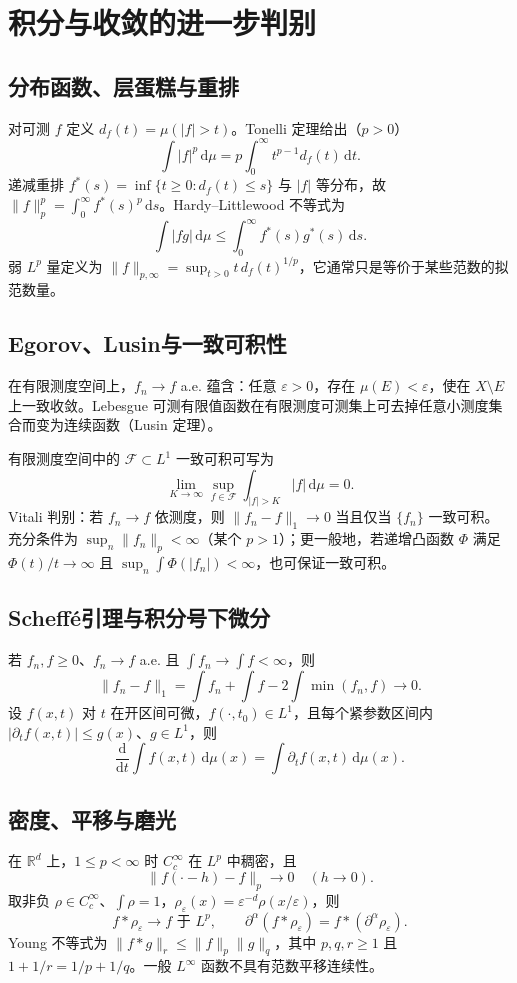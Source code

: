 \documentclass[../main.tex]{subfiles}
\begin{document}
\section{积分与收敛的进一步判别}
\subsection{分布函数、层蛋糕与重排}
对可测 $f$ 定义 $d_f(t)=\mu(|f|>t)$。Tonelli 定理给出（$p>0$）
\[
\int|f|^p\,\mathrm d\mu=p\int_0^\infty t^{p-1}d_f(t)\,\mathrm dt.
\]
递减重排 $f^*(s)=\inf\{t\ge0:d_f(t)\le s\}$ 与 $|f|$ 等分布，故 $\|f\|_p^p=\int_0^\infty f^*(s)^p\,\mathrm ds$。Hardy--Littlewood 不等式为
\[
\int|fg|\,\mathrm d\mu\le\int_0^\infty f^*(s)g^*(s)\,\mathrm ds.
\]
弱 $L^p$ 量定义为 $\|f\|_{p,\infty}=\sup_{t>0}t\,d_f(t)^{1/p}$，它通常只是等价于某些范数的拟范数量。
\subsection{Egorov、Lusin与一致可积性}
在有限测度空间上，$f_n\to f$ a.e. 蕴含：任意 $\varepsilon>0$，存在 $\mu(E)<\varepsilon$，使在 $X\setminus E$ 上一致收敛。Lebesgue 可测有限值函数在有限测度可测集上可去掉任意小测度集合而变为连续函数（Lusin 定理）。

有限测度空间中的 $\mathcal F\subset L^1$ 一致可积可写为
\[
\lim_{K\to\infty}\sup_{f\in\mathcal F}\int_{|f|>K}|f|\,\mathrm d\mu=0.
\]
Vitali 判别：若 $f_n\to f$ 依测度，则 $\|f_n-f\|_1\to0$ 当且仅当 $\{f_n\}$ 一致可积。充分条件为 $\sup_n\|f_n\|_p<\infty$（某个 $p>1$）；更一般地，若递增凸函数 $\Phi$ 满足 $\Phi(t)/t\to\infty$ 且 $\sup_n\int\Phi(|f_n|)<\infty$，也可保证一致可积。
\subsection{Scheffé引理与积分号下微分}
若 $f_n,f\ge0$、$f_n\to f$ a.e. 且 $\int f_n\to\int f<\infty$，则
\[
\|f_n-f\|_1=\int f_n+\int f-2\int\min(f_n,f)\longrightarrow0.
\]
设 $f(x,t)$ 对 $t$ 在开区间可微，$f(\cdot,t_0)\in L^1$，且每个紧参数区间内 $|\partial_tf(x,t)|\le g(x)$、$g\in L^1$，则
\[
\frac{\mathrm d}{\mathrm dt}\int f(x,t)\,\mathrm d\mu(x)
=\int\partial_tf(x,t)\,\mathrm d\mu(x).
\]
\subsection{密度、平移与磨光}
在 $\mathbb R^d$ 上，$1\le p<\infty$ 时 $C_c^\infty$ 在 $L^p$ 中稠密，且
\[
\|f(\cdot-h)-f\|_p\to0\quad(h\to0).
\]
取非负 $\rho\in C_c^\infty$、$\int\rho=1$，$\rho_\varepsilon(x)=\varepsilon^{-d}\rho(x/\varepsilon)$，则
\[
f*\rho_\varepsilon\to f\text{ 于 }L^p,\qquad
\partial^\alpha(f*\rho_\varepsilon)=f*(\partial^\alpha\rho_\varepsilon).
\]
Young 不等式为 $\|f*g\|_r\le\|f\|_p\|g\|_q$，其中 $p,q,r\ge1$ 且 $1+1/r=1/p+1/q$。一般 $L^\infty$ 函数不具有范数平移连续性。
\end{document}
